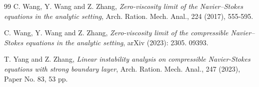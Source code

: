 \documentclass[reqno,11pt]{amsart}
\numberwithin{equation}{section}
\numberwithin{equation}{section}
\theoremstyle{plain}
\begin{document}
\begin{thebibliography}{99}
 C. Wang, Y. Wang and Z. Zhang, {\it Zero-viscosity limit of the Navier–Stokes equations in the analytic setting},  Arch. Ration. Mech. Anal., 224 (2017), 555-595.

 C. Wang, Y. Wang and Z. Zhang, {\it Zero-viscosity limit of the compressible Navier–Stokes equations in the analytic setting},  arXiv (2023): 2305. 09393.

 T. Yang and Z. Zhang, {\it Linear instability analysis on compressible Navier-Stokes equations with strong boundary layer},  Arch. Ration. Mech. Anal., 247 (2023), Paper No. 83, 53 pp.

    

    \end{thebibliography}
    
\end{document}

